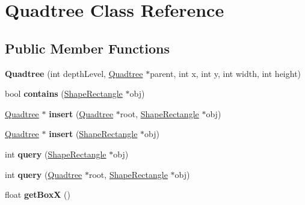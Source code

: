 \hypertarget{class_quadtree}{}\section{Quadtree Class Reference}
\label{class_quadtree}
\subsection*{Public Member Functions}
\begin{DoxyCompactItemize}
\item 
\hypertarget{class_quadtree_a79f95d180ce568314925c1e9abe6c45d}{}{\bfseries Quadtree} (int depth\+Level, \hyperlink{class_quadtree}{Quadtree} $\ast$parent, int x, int y, int width, int height)\label{class_quadtree_a79f95d180ce568314925c1e9abe6c45d}

\item 
\hypertarget{class_quadtree_a276321a0dbd5483f74f2384135b38712}{}bool {\bfseries contains} (\hyperlink{class_shape_rectangle}{Shape\+Rectangle} $\ast$obj)\label{class_quadtree_a276321a0dbd5483f74f2384135b38712}

\item 
\hypertarget{class_quadtree_a9c3de471840094c1f848bcf508168432}{}\hyperlink{class_quadtree}{Quadtree} $\ast$ {\bfseries insert} (\hyperlink{class_quadtree}{Quadtree} $\ast$root, \hyperlink{class_shape_rectangle}{Shape\+Rectangle} $\ast$obj)\label{class_quadtree_a9c3de471840094c1f848bcf508168432}

\item 
\hypertarget{class_quadtree_a0d2e07e82db56692a78b652f31251769}{}\hyperlink{class_quadtree}{Quadtree} $\ast$ {\bfseries insert} (\hyperlink{class_shape_rectangle}{Shape\+Rectangle} $\ast$obj)\label{class_quadtree_a0d2e07e82db56692a78b652f31251769}

\item 
\hypertarget{class_quadtree_a20cf32628f9868b1472418c40710b5f7}{}int {\bfseries query} (\hyperlink{class_shape_rectangle}{Shape\+Rectangle} $\ast$obj)\label{class_quadtree_a20cf32628f9868b1472418c40710b5f7}

\item 
\hypertarget{class_quadtree_a3aac684e51f7e23c96a589dd8e46215c}{}int {\bfseries query} (\hyperlink{class_quadtree}{Quadtree} $\ast$root, \hyperlink{class_shape_rectangle}{Shape\+Rectangle} $\ast$obj)\label{class_quadtree_a3aac684e51f7e23c96a589dd8e46215c}

\item 
\hypertarget{class_quadtree_aec8169cb90978860817ef14d2a9a0d32}{}float {\bfseries get\+Box\+X} ()\label{class_quadtree_aec8169cb90978860817ef14d2a9a0d32}


\end{DoxyCompactItemize}
